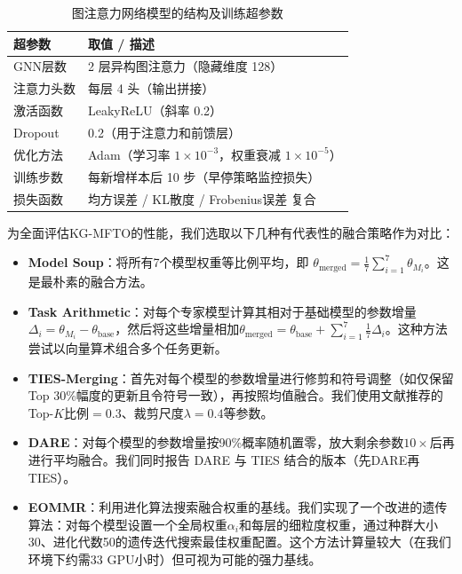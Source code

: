\documentclass[../main.tex]{subfiles}
\begin{document}
\begin{table}[tb]
	\centering\small
	\caption{图注意力网络模型的结构及训练超参数}
	\label{tab:gat-hyperparams}
	\small\begin{tabular}{ll}
		\toprule
		\textbf{超参数} & \textbf{取值 / 描述}                                 \\
		\midrule
		GNN层数        & 2 层异构图注意力（隐藏维度 128）                              \\
		注意力头数        & 每层 4 头（输出拼接）                                     \\
		激活函数         & LeakyReLU（斜率 0.2）                                \\
		Dropout      & 0.2（用于注意力和前馈层）                                   \\
		优化方法         & Adam（学习率 $1\times10^{-3}$，权重衰减 $1\times10^{-5}$） \\
		训练步数         & 每新增样本后 10 步（早停策略监控损失）                            \\
		损失函数         & 均方误差 / KL散度 / Frobenius误差 复合                \\
		\bottomrule
	\end{tabular}
\end{table}


为全面评估KG-MFTO的性能，我们选取以下几种有代表性的融合策略作为对比：

\begin{itemize}[leftmargin=3\ccwd]
	\item \textbf{Model Soup}：将所有7个模型权重等比例平均，即 $\theta_{\text{merged}} = \frac{1}{7}\sum_{i=1}^{7}\theta_{M_i}$。这是最朴素的融合方法。
	\item \textbf{Task Arithmetic}：对每个专家模型计算其相对于基础模型的参数增量$\Delta_i=\theta_{M_i}-\theta_{\text{base}}$，然后将这些增量相加$\theta_{\text{merged}}=\theta_{\text{base}} + \sum_{i=1}^7 \frac{1}{7}\Delta_i$。这种方法尝试以向量算术组合多个任务更新。
	\item \textbf{TIES-Merging}：首先对每个模型的参数增量进行修剪和符号调整（如仅保留Top 30\%幅度的更新且令符号一致），再按照均值融合。我们使用文献推荐的Top-$K$比例$=0.3$、裁剪尺度$\lambda=0.4$等参数。
	\item \textbf{DARE}：对每个模型的参数增量按90\%概率随机置零，放大剩余参数$10\times$后再进行平均融合。我们同时报告 DARE 与 TIES 结合的版本（先DARE再TIES）。
	\item \textbf{EOMMR}：利用进化算法搜索融合权重的基线。我们实现了一个改进的遗传算法：对每个模型设置一个全局权重$\alpha_i$和每层的细粒度权重，通过种群大小30、进化代数50的遗传迭代搜索最佳权重配置。这个方法计算量较大（在我们环境下约需33 GPU小时）但可视为可能的强力基线。
\end{itemize}
\end{document}
